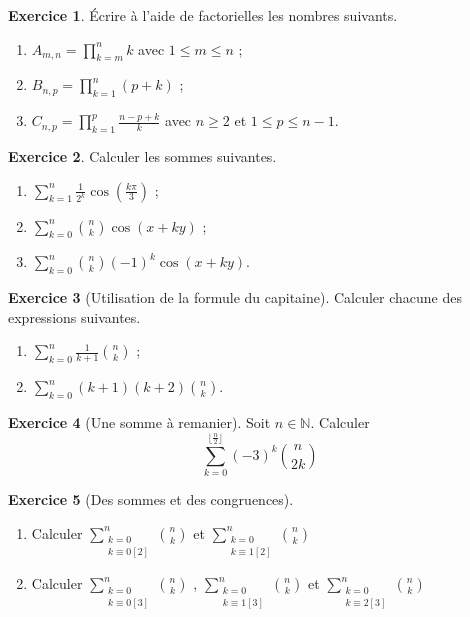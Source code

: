 \documentclass[french]{book}
\newcommand{\N}{\mathbb{N}}
\theoremstyle{definition}
\newtheorem{ex}{Exercice}[chapter]
\theoremstyle{theorem}
\theoremstyle{remark}
\begin{document}
\begin{ex}
	Écrire à l'aide de factorielles les nombres suivants.
	\begin{enumerate}
		\item $\displaystyle A_{m,n}=\prod_{k=m}^{n}k$ avec $1\leqslant m\leqslant n$ ;
		\item $\displaystyle B_{n,p}=\prod_{k=1}^{n}(p+k)$ ;
		\item $\displaystyle C_{n,p}=\prod_{k=1}^{p}\frac{n-p+k}{k}$ avec $n\geqslant 2$ et $1\leqslant p\leqslant n-1$.
	\end{enumerate}
\end{ex}

\begin{ex}
	Calculer les sommes suivantes.
	\begin{enumerate}
		\item $\displaystyle\sum_{k=1}^{n}\frac{1}{2^k}\cos\left(\frac{k\pi}{3}\right)$ ;
		\item $\displaystyle\sum_{k=0}^{n}\binom{n}{k}\cos(x+ky)$ ;
		\item $\displaystyle\sum_{k=0}^{n}\binom{n}{k}(-1)^k\cos(x+ky)$.
	\end{enumerate}
\end{ex}

\begin{ex}[Utilisation de la formule du capitaine]
	Calculer chacune des expressions suivantes.
	\begin{enumerate}
		\item $\displaystyle\sum_{k=0}^{n}\frac{1}{k+1}\binom{n}{k}$ ;
		\item $\displaystyle\sum_{k=0}^{n}(k+1)(k+2)\binom{n}{k}$.
	\end{enumerate}
\end{ex}

\begin{ex}[Une somme à remanier]
	Soit $n \in \N$. Calculer $$ \sum_{k=0}^{\lfloor \frac{n}{2} \rfloor} (-3)^k\binom{n}{2k}$$
\end{ex}

\begin{ex}[Des sommes et des congruences]
	\begin{enumerate}
		\item Calculer $\displaystyle \sum_{\substack{k=0 \\ k \equiv 0 [2]}}^{n} \binom{n}{k}$ et $\displaystyle \sum_{\substack{k=0 \\ k \equiv 1 [2]}}^{n} \binom{n}{k}$ 
		\item Calculer $\displaystyle \sum_{\substack{k=0 \\ k \equiv 0 [3]}}^{n} \binom{n}{k}$ , $\displaystyle \sum_{\substack{k=0 \\ k \equiv 1 [3]}}^{n} \binom{n}{k}$ et $\displaystyle \sum_{\substack{k=0 \\ k \equiv 2 [3]}}^{n} \binom{n}{k}$
	\end{enumerate}
\end{ex}
\end{document}

